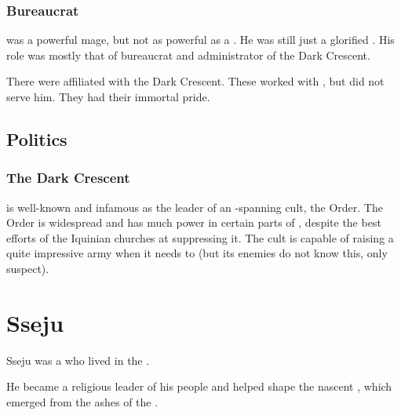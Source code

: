 \subsubsection{Bureaucrat}
\Psyrex was a powerful mage, but not as powerful as a \quiljaaran.
He was still just a glorified \scatha. 
His role was mostly that of bureaucrat and administrator of the Dark Crescent. 

There were \quiljaaran affiliated with the Dark Crescent. 
These worked with \Psyrex, but did not serve him.
They had their immortal pride. 









\subsection{Politics}
\subsubsection{The Dark Crescent}
\Psyrex{} is well-known and infamous as the leader of an \Azmith-spanning cult, the  Order. The Order is widespread and has much power in certain parts of \Velcad{}, despite the best efforts of the Iquinian churches at suppressing it. The cult is capable of raising a quite impressive army when it needs to (but its enemies do not know this, only suspect). 
















\section{Sseju}
Sseju was a \scatha{} who lived in the \VaimonCaliphate. 

He became a religious leader of his people and helped shape the nascent , which emerged from the ashes of the .









